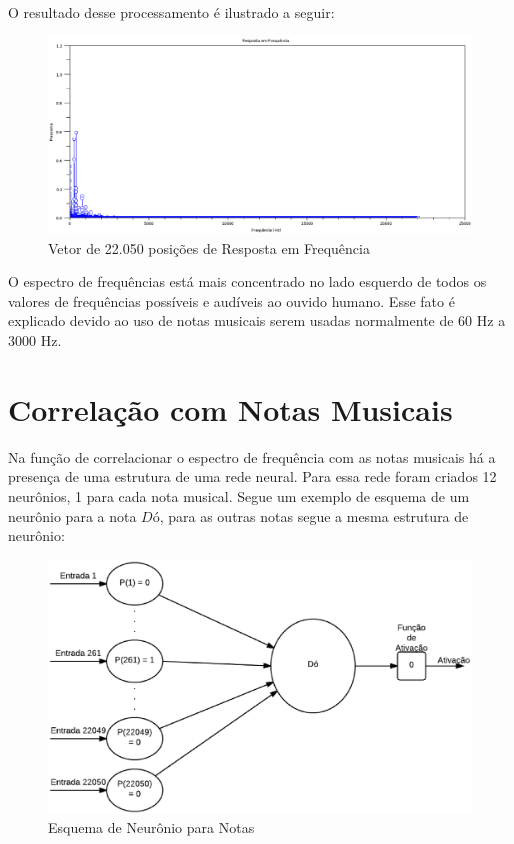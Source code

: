 O resultado desse processamento é ilustrado a seguir:

\begin{figure}[h]
	\centering
		\includegraphics[keepaspectratio=true,scale=0.45]{figuras/fft-resultado}
	\caption{Vetor de 22.050 posições de Resposta em Frequência}
\end{figure}

O espectro de frequências está mais concentrado no lado esquerdo de todos os valores de frequências possíveis e audíveis ao ouvido humano. Esse fato é explicado devido ao uso de notas musicais serem usadas normalmente de 60 Hz a 3000 Hz.

\newpage
\section{Correlação com Notas Musicais}
\label{sec:correlacaonotas}

Na função de correlacionar o espectro de frequência com as notas musicais há a presença de uma estrutura de uma rede neural. Para essa rede foram criados 12 neurônios, 1 para cada nota musical. Segue um exemplo de esquema de um neurônio para a nota $Dó$, para as outras notas segue a mesma estrutura de neurônio:

\begin{figure}[h]
	\centering
		\includegraphics[keepaspectratio=true,scale=0.41]{figuras/neuron_notes}
	\caption{Esquema de Neurônio para Notas}
\end{figure}

